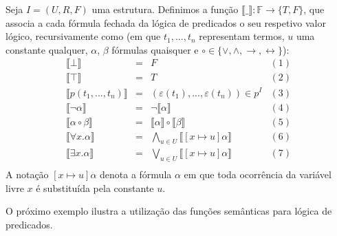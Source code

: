\begin{Definition}\label{predlogicformulasem}
Seja $I=(U,R,F)$ uma estrutura. Definimos a função $\llbracket\_\rrbracket :
\mathbb{F}\to \{T,F\}$, que associa a cada fórmula fechada da lógica de
predicados o seu respetivo valor lógico, recursivamente como (em que
$t_1,...,t_n$ representam termos, $u$ uma constante qualquer, $\alpha$,
$\beta$ fórmulas quaisquer e $\circ\in\{\lor,\land,\to,\leftrightarrow\}$):
\[
\begin{array}{lclc}
\llbracket \bot \rrbracket & = & F & (1)\\
\llbracket \top \rrbracket & = & T & (2)\\
\llbracket p(t_1,...,t_n) \rrbracket & = & (\varepsilon(t_1),...,\varepsilon(t_n))
\in p^I & (3)\\
\llbracket \neg \alpha \rrbracket & = & \neg \llbracket \alpha
\rrbracket & (4) \\
\llbracket \alpha \circ \beta \rrbracket & = & \llbracket \alpha
\rrbracket \circ \llbracket \beta \rrbracket & (5)\\
\llbracket \forall x. \alpha \rrbracket & = & \bigwedge\limits_{u\in
  U}\llbracket [x \mapsto u] \alpha \rrbracket & (6)\\
\llbracket \exists x. \alpha \rrbracket & = & \bigvee\limits_{u\in
  U}\llbracket [x \mapsto u] \alpha \rrbracket & (7)\\
\end{array}
\]
A notação $[x\mapsto u]\alpha$ denota a fórmula $\alpha$ em que toda
ocorrência da variável livre $x$ é substituída pela constante $u$.
\end{Definition}
O próximo exemplo ilustra a utilização das funções semânticas para
lógica de predicados.

